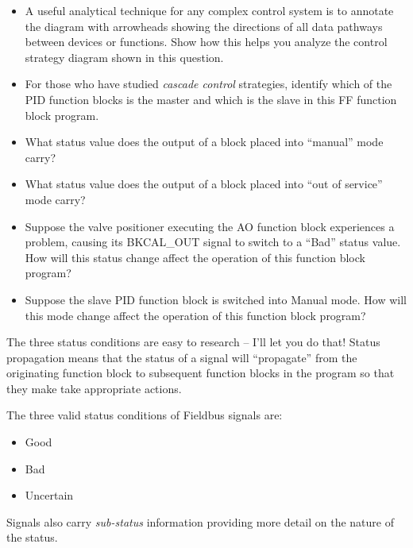 \begin{itemize}
\item{} A useful analytical technique for any complex control system is to annotate the diagram with arrowheads showing the directions of all data pathways between devices or functions.  Show how this helps you analyze the control strategy diagram shown in this question.
\item{} For those who have studied {\it cascade control} strategies, identify which of the PID function blocks is the master and which is the slave in this FF function block program.
\item{} What status value does the output of a block placed into ``manual'' mode carry?
\item{} What status value does the output of a block placed into ``out of service'' mode carry?
\item{} Suppose the valve positioner executing the AO function block experiences a problem, causing its BKCAL\_OUT signal to switch to a ``Bad'' status value.  How will this status change affect the operation of this function block program?
\item{} Suppose the slave PID function block is switched into Manual mode.  How will this mode change affect the operation of this function block program?
\end{itemize}







The three status conditions are easy to research -- I'll let you do that!  Status propagation means that the status of a signal will ``propagate'' from the originating function block to subsequent function blocks in the program so that they make take appropriate actions.







The three valid status conditions of Fieldbus signals are:

\begin{itemize}
\item{} Good
\item{} Bad
\item{} Uncertain
\end{itemize}

Signals also carry {\it sub-status} information providing more detail on the nature of the status.

